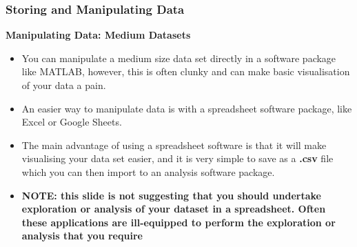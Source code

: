 \documentclass{beamer}
\begin{document}
\begin{frame}
\frametitle{Storing and Manipulating Data}
\textbf{Manipulating Data: Medium Datasets}\\
\vspace{0.5cm}
\begin{itemize}
\item You can manipulate a medium size data set directly in a software package like MATLAB, however, this is often clunky and can make basic visualisation of your data a pain.
\vspace{0.2cm}
\item An easier way to manipulate data is with a spreadsheet software package, like Excel or Google Sheets.
\vspace{0.2cm}
\item The main advantage of using a spreadsheet software is that it will make visualising your data set easier, and it is very simple to save as a \textbf{.csv} file which you can then import to an analysis software package.
\vspace{0.2cm}
\item \textbf{NOTE: this slide is not suggesting that you should undertake exploration or analysis of your dataset in a spreadsheet. Often these applications are ill-equipped to perform the exploration or analysis that you require}
\end{itemize}
\end{frame}



\end{document}
